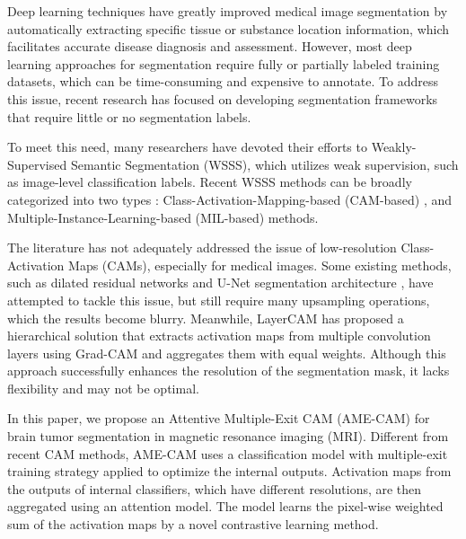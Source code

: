 

Deep learning techniques have greatly improved medical image segmentation by automatically extracting specific tissue or substance location information, which facilitates accurate disease diagnosis and assessment. However, most deep learning approaches for segmentation require fully or partially labeled training datasets, which can be time-consuming and expensive to annotate. To address this issue, recent research has focused on developing segmentation frameworks that require little or no segmentation labels.

To meet this need, many researchers have devoted their efforts to Weakly-Supervised Semantic Segmentation (WSSS)\cite{wolleb2022diffusion}, which utilizes weak supervision, such as image-level classification labels. Recent WSSS methods can be broadly categorized into two types \cite{chan2021comprehensive}: Class-Activation-Mapping-based (CAM-based) \cite{selvaraju2017grad,wang2020score,jiang2021layercam,wang2020self,lee2021lfi,xie2022c2am}, and Multiple-Instance-Learning-based (MIL-based) \cite{qian2022transformer} methods.

The literature has not adequately addressed the issue of low-resolution Class-Activation Maps (CAMs), especially for medical images. Some existing methods, such as dilated residual networks \cite{yu2017dilated} and U-Net segmentation architecture \cite{belharbi2022f,englebert2022poly,tagaris2019high}, have attempted to tackle this issue, but still require many upsampling operations, which the results become blurry. Meanwhile, LayerCAM \cite{jiang2021layercam} has proposed a hierarchical solution that extracts activation maps from multiple convolution layers using Grad-CAM\cite{selvaraju2017grad} and aggregates them with equal weights. Although this approach successfully enhances the resolution of the segmentation mask, it lacks flexibility and may not be optimal.

In this paper, we propose an Attentive Multiple-Exit CAM (AME-CAM) for brain tumor segmentation in magnetic resonance imaging (MRI). Different from recent CAM methods, AME-CAM uses a classification model with multiple-exit training strategy applied to optimize the internal outputs. Activation maps from the outputs of internal classifiers, which have different resolutions, are then aggregated using an attention model. The model learns the pixel-wise weighted sum of the activation maps by a novel contrastive learning method.

